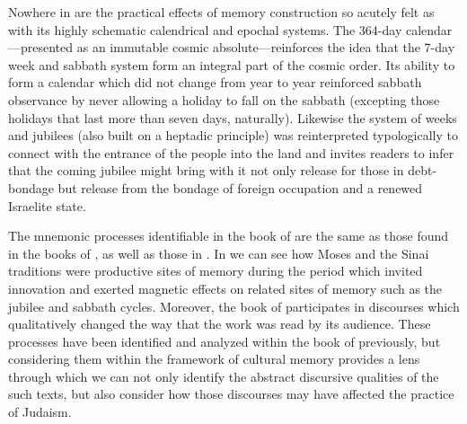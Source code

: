 Nowhere in \jub are the practical effects of memory construction so acutely felt as with its highly schematic calendrical and epochal systems. The 364-day calendar---presented as an immutable cosmic absolute---reinforces the idea that the 7-day week and sabbath system form an integral part of the cosmic order.%
    \autocite{fraade_dine-israel2010}
Its ability to form a calendar which did not change from year to year reinforced sabbath observance by never allowing a holiday to fall on the sabbath (excepting those holidays that last more than seven days, naturally). Likewise the system of weeks and jubilees (also built on a heptadic principle) was reinterpreted typologically to connect with the entrance of the people into the land and invites readers to infer that the coming jubilee might bring with it not only release for those in debt-bondage but release from the bondage of foreign occupation and a renewed Israelite state.

The mnemonic processes identifiable in the book of \jub are the same as those found in the books of \chronicles, as well as those in \ga. In \jub we can see how Moses and the Sinai traditions were productive sites of memory during the \secondtemple period which invited innovation and exerted magnetic effects on related sites of memory such as the jubilee and sabbath cycles. Moreover, the book of \jub participates in \psgraphical discourses which qualitatively changed the way that the work was read by its audience. These processes have been identified and analyzed within the book of \jub previously, but considering them within the framework of cultural memory provides a lens through which we can not only identify the abstract discursive qualities of the such texts, but also consider how those discourses may have affected the practice of \secondtemple Judaism.